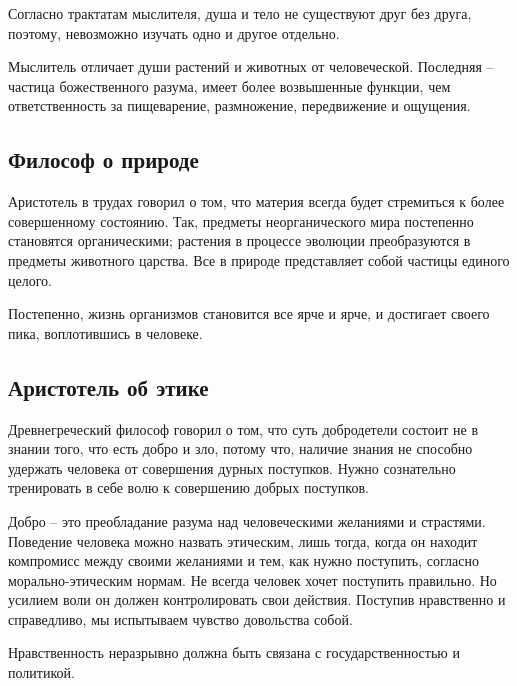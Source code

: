 \documentclass[
]{article}
\begin{document}
Согласно трактатам мыслителя, душа и тело не существуют друг без друга,
поэтому, невозможно изучать одно и другое отдельно.

Мыслитель отличает души растений и животных от человеческой. Последняя
-- частица божественного разума, имеет более возвышенные функции, чем
ответственность за пищеварение, размножение, передвижение и ощущения.

\hypertarget{ux444ux438ux43bux43eux441ux43eux444-ux43e-ux43fux440ux438ux440ux43eux434ux435}{%
\subsection{Философ о
природе}\label{ux444ux438ux43bux43eux441ux43eux444-ux43e-ux43fux440ux438ux440ux43eux434ux435}}

Аристотель в трудах говорил о том, что материя всегда будет стремиться к
более совершенному состоянию. Так, предметы неорганического мира
постепенно становятся органическими; растения в процессе эволюции
преобразуются в предметы животного царства. Все в природе представляет
собой частицы единого целого.

Постепенно, жизнь организмов становится все ярче и ярче, и достигает
своего пика, воплотившись в человеке.

\hypertarget{ux430ux440ux438ux441ux442ux43eux442ux435ux43bux44c-ux43eux431-ux44dux442ux438ux43aux435}{%
\subsection{Аристотель об
этике}\label{ux430ux440ux438ux441ux442ux43eux442ux435ux43bux44c-ux43eux431-ux44dux442ux438ux43aux435}}

Древнегреческий философ говорил о том, что суть добродетели состоит не в
знании того, что есть добро и зло, потому что, наличие знания не
способно удержать человека от совершения дурных поступков. Нужно
сознательно тренировать в себе волю к совершению добрых поступков.

Добро -- это преобладание разума над человеческими желаниями и
страстями. Поведение человека можно назвать этическим, лишь тогда, когда
он находит компромисс между своими желаниями и тем, как нужно поступить,
согласно морально-этическим нормам. Не всегда человек хочет поступить
правильно. Но усилием воли он должен контролировать свои действия.
Поступив нравственно и справедливо, мы испытываем чувство довольства
собой.

Нравственность неразрывно должна быть связана с государственностью и
политикой.
\end{document}
